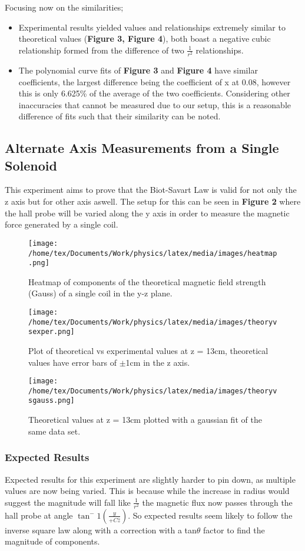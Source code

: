 \documentclass{article}
\begin{document}
   Focusing now on the similarities;
   \begin{itemize}
       \item Experimental results yielded values and relationships extremely similar to theoretical values (\textbf{Figure 3, Figure 4}), both boast a negative cubic relationship 
       formed from the difference of two \(\frac{1}{r^2}\) relationships.
       \item The polynomial curve fits of \textbf{Figure 3} and \textbf{Figure 4} have similar coefficients, the largest difference being the coefficient of x at 0.08, however this is only 6.625\% of the average of the 
       two coefficients. Considering other inaccuracies that cannot be measured due to our setup, this is a reasonable difference of fits such that their similarity can be noted.
   \end{itemize}
   \subsection{Alternate Axis Measurements from a Single Solenoid}
   This experiment aims to prove that the Biot-Savart Law is valid for not only the z axis but for other axis aswell. The setup for this can be seen in \textbf{Figure 2}
   where the hall probe will be varied along the y axis in order to measure the magnetic force generated by a single coil.
   \begin{figure}
       \centering
       \texttt{[image: /home/tex/Documents/Work/physics/latex/media/images/heatmap.png]}
       \caption{Heatmap of components of the theoretical magnetic field strength (Gauss) of a single coil in the y-z plane.}
   \end{figure}
   \begin{figure}
        \centering
        \texttt{[image: /home/tex/Documents/Work/physics/latex/media/images/theoryvsexper.png]}
        \caption{Plot of theoretical vs experimental values at z = 13cm, theoretical values have error bars of \(\pm\)1cm in the z axis.}
   \end{figure}
   \begin{figure}
       \centering
       \texttt{[image: /home/tex/Documents/Work/physics/latex/media/images/theoryvsgauss.png]}
       \caption{Theoretical values at z = 13cm plotted with a gaussian fit of the same data set.}
   \end{figure}
   \subsubsection{Expected Results}
   Expected results for this experiment are slightly harder to pin down, as multiple values are now being varied. This is because while the increase in radius would
   suggest the magnitude will fall like \(\frac{1}{r^2}\) the magnetic flux now passes through the hall probe at angle \(\tan^-1(\frac{y}{+C\hat{z}})\). So expected results 
   seem likely to follow the inverse square law along with a correction with a tan\(\theta\) factor to find the magnitude of components.
\end{document}
